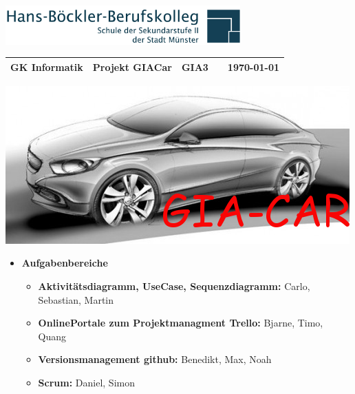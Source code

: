\documentclass[11pt,a4paper]{letter}
\begin{document}
\raggedleft\includegraphics[height=1.5cm]{images/hbbk-logo.png}
\\
\begin{tabular}{p{4cm} p{5cm} p{1.5cm} p{1.5cm} p{3cm}}
  \tabularnewline
  \textbf{GK Informatik} & \textbf{Projekt GIACar}    & GIA3    &  & {\today} \tabularnewline 
  \hline
\end{tabular}


\centering
\includegraphics[width=0.7\linewidth]{./images/GIAcar}


\normalsize
\begin{itemize}
\item \textbf{Aufgabenbereiche}
	\begin{itemize}
	\item \textbf{Aktivitätsdiagramm, UseCase, Sequenzdiagramm:} Carlo, Sebastian, Martin
	\item \textbf{OnlinePortale zum Projektmanagment Trello:} Bjarne, Timo, Quang
	\item \textbf{Versionsmanagement github:} Benedikt, Max, Noah
	\item \textbf{Scrum:} Daniel, Simon
	\end{itemize}
\end{itemize}
\end{document}

